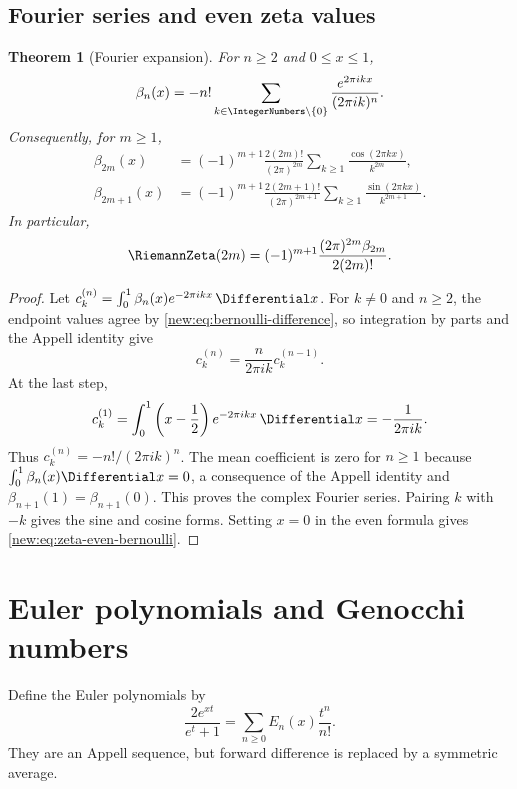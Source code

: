 \documentclass[11pt,a4paper,oneside,openany]{book}
\newtheorem{theorem}{Theorem}[chapter]
\theoremstyle{definition}
\theoremstyle{remark}
\begin{document}
\section{Fourier series and even zeta values}

\begin{theorem}[Fourier expansion]
For $n\ge2$ and $0\le x\le1$,
\begin{equation}
 \beta_n(x)=-n!\sum_{k\in\IntegerNumbers\setminus\{0\}}
 \frac{e^{2\pi ikx}}{(2\pi ik)^n}.
 \label{new:eq:bernoulli-fourier-complex}
\end{equation}
Consequently, for $m\ge1$,
\begin{align}
 \beta_{2m}(x)
 &=(-1)^{m+1}\frac{2(2m)!}{(2\pi)^{2m}}
   \sum_{k\ge1}\frac{\cos(2\pi kx)}{k^{2m}},
 \label{new:eq:bernoulli-fourier-even}\\
 \beta_{2m+1}(x)
 &=(-1)^{m+1}\frac{2(2m+1)!}{(2\pi)^{2m+1}}
   \sum_{k\ge1}\frac{\sin(2\pi kx)}{k^{2m+1}}.
 \label{new:eq:bernoulli-fourier-odd}
\end{align}
In particular,
\begin{equation}
 \RiemannZeta(2m)=(-1)^{m+1}
 \frac{(2\pi)^{2m}\beta_{2m}}{2(2m)!}.
 \label{new:eq:zeta-even-bernoulli}
\end{equation}
\end{theorem}

\begin{proof}
Let $c_k^{(n)}=\int_0^1\beta_n(x)e^{-2\pi ikx}\,\Differential x$.  For $k\ne0$ and
$n\ge2$, the endpoint values agree by
\eqref{new:eq:bernoulli-difference}, so integration by parts and the Appell
identity give
\[
 c_k^{(n)}=\frac{n}{2\pi ik}c_k^{(n-1)}.
\]
At the last step,
\[
 c_k^{(1)}=\int_0^1\left(x-\frac12\right)e^{-2\pi ikx}\,\Differential x
 =-\frac1{2\pi ik}.
\]
Thus $c_k^{(n)}=-n!/(2\pi ik)^n$.  The mean coefficient is zero for $n\ge1$
because $\int_0^1\beta_n(x)\Differential x=0$, a consequence of the Appell identity and
$\beta_{n+1}(1)=\beta_{n+1}(0)$.  This proves the complex Fourier series.
Pairing $k$ with $-k$ gives the sine and cosine forms.  Setting $x=0$ in the
even formula gives \eqref{new:eq:zeta-even-bernoulli}.
\end{proof}

\chapter{Euler polynomials and Genocchi numbers}
\label{ch:euler-genocchi}

Define the Euler polynomials by
\begin{equation}
 \frac{2e^{xt}}{e^t+1}
 =\sum_{n\ge0}E_n(x)\frac{t^n}{n!}.
 \label{new:eq:euler-polynomial-egf}
\end{equation}
They are an Appell sequence, but forward difference is replaced by a symmetric
average.
\end{document}

